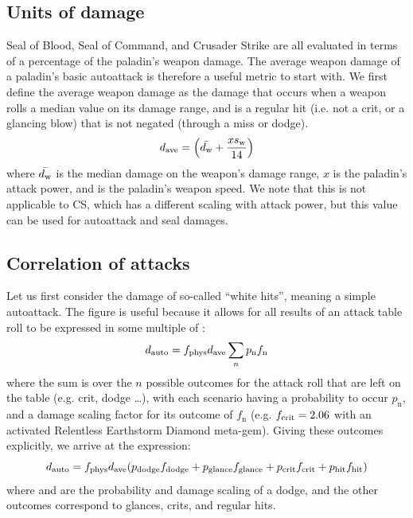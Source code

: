 \subsection{Units of damage}
Seal of Blood, Seal of Command, and Crusader Strike are all evaluated in terms of a percentage of the paladin's weapon damage.
The average weapon damage of a paladin's basic autoattack is therefore a useful metric to start with.
We first define the average weapon damage as the damage that occurs when a weapon rolls a median value on its damage range, and is a regular hit (i.e. not a crit, or a glancing blow) that is not negated (through a miss or dodge).
\begin{equation}
	d_{\mathrm{ave}}  = \left( \bar{d_\mathrm{w} } + \frac{xs_\mathrm{w} }{14} \right)
\end{equation}
where $\bar{d_\mathrm{w} }$ is the median damage on the weapon's damage range, $x$ is the paladin's attack power, and \ws is the paladin's weapon speed.
We note that this is not applicable to CS, which has a different scaling with attack power, but this value can be used for autoattack and seal damages.

\subsection{Correlation of attacks}
Let us first consider the damage \dauto of so-called ``white hits'', meaning a simple autoattack.
The \dave figure is useful because it allows for all results of an attack table roll to be expressed in some multiple of \dave:
\begin{equation}
	d_{\mathrm{auto}}  = f_{\mathrm{phys}}  d_{\mathrm{ave}}  \sum_n p_{\mathrm{n}} f_{\mathrm{n}}
\end{equation}
where the sum is over the $n$ possible outcomes for the attack roll that are left on the table (e.g. crit, dodge \ldots), with each scenario having a probability to occur $p_{\mathrm{n}}$, and a damage scaling factor for its outcome of $f_{\mathrm{n}}$ (e.g. $f_{\mathrm{crit}}  = 2.06$ with an activated Relentless Earthstorm Diamond meta-gem).
Giving these outcomes explicitly, we arrive at the expression:
\begin{equation}
	d_{\mathrm{auto}}  = f_{\mathrm{phys}}  d_{\mathrm{ave}}  (p_{\mathrm{dodge}}  f_{\mathrm{dodge}}  + p_{\mathrm{glance}}  f_{\mathrm{glance}}  + p_{\mathrm{crit}}  f_{\mathrm{crit}}  + p_{\mathrm{hit}}  f_{\mathrm{hit}} )
\end{equation}
where \pdodge and \fdodge are the probability and damage scaling of a dodge, and the other outcomes correspond to glances, crits, and regular hits. 


